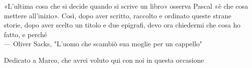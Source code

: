 
\cleardoublepage
{}
\thispagestyle{empty}

\vspace*{3cm}

\begin{center}
    «L'ultima cosa che si decide quando si scrive un libro» osserva Pascal «è che cosa mettere all'inizio». Così, dopo aver scritto, raccolto e ordinato queste strane storie, dopo aver scelto un titolo e due epigrafi, devo ora chiedermi che cosa ho fatto, e perché \\ \medskip
--- Oliver Sacks, "L'uomo che scambiò sua moglie per un cappello"    
\end{center}

\medskip

\begin{center}
Dedicato a Marco, che avrei voluto qui con noi in questa occasione
\end{center}

